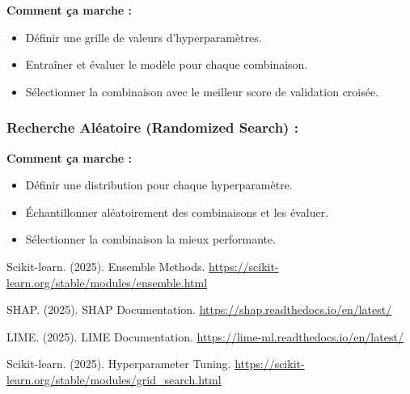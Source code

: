 \documentclass[10pt,a4paper]{article}
\begin{document}
\textbf{Comment ça marche :}
\begin{itemize}
    \item Définir une grille de valeurs d'hyperparamètres.
    \item Entraîner et évaluer le modèle pour chaque combinaison.
    \item Sélectionner la combinaison avec le meilleur score de validation croisée.
\end{itemize}


\subsubsection*{Recherche Aléatoire (Randomized Search) :}

\textbf{Comment ça marche :}
\begin{itemize}
    \item Définir une distribution pour chaque hyperparamètre.
    \item Échantillonner aléatoirement des combinaisons et les évaluer.
    \item Sélectionner la combinaison la mieux performante.
\end{itemize}


\begin{thebibliography}{9}
Scikit-learn. (2025). Ensemble Methods.
\url{https://scikit-learn.org/stable/modules/ensemble.html}

SHAP. (2025). SHAP Documentation.
\url{https://shap.readthedocs.io/en/latest/}

LIME. (2025). LIME Documentation.
\url{https://lime-ml.readthedocs.io/en/latest/}

Scikit-learn. (2025). Hyperparameter Tuning.
\url{https://scikit-learn.org/stable/modules/grid_search.html}
\end{thebibliography}
\end{document}
